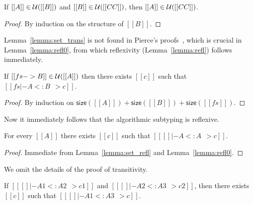 \begin{lemma} \label{lemma:set_trans}
  If $[[A]] \in \mathcal{U}([[B]])$ and $[[B]] \in \mathcal{U}([[CC]])$, then $[[A]] \in \mathcal{U}([[CC]])$.
\end{lemma}
\begin{proof}
  By induction on the structure of $[[B]]$.
\end{proof}

\begin{remark}
  Lemma~\ref{lemma:set_trans} is not found in Pierce's proofs~\cite{pierce1989decision}, which is
  crucial in Lemma~\ref{lemma:refl0}, from which reflexivity (Lemma~\ref{lemma:refl})
  follows immediately.
\end{remark}


\begin{lemma} \label{lemma:refl0}
  If $[[fs -> B]] \in \mathcal{U}([[A]])$ then there exists $[[c]]$ such that $[[fs |- A <: B ~~> c]]$.
\end{lemma}
\begin{proof}
  By induction on $\mathsf{size}([[A]]) + \mathsf{size}([[B]]) + \mathsf{size}([[fs]])$.
\end{proof}

Now it immediately follows that the algorithmic subtyping is reflexive.

\begin{lemma}[Reflexivity] \label{lemma:refl}
  For every $[[A]]$ there exists $[[c]]$ such that $[[ [] |- A <: A ~~> c]]$.
\end{lemma}
\begin{proof}
  Immediate from Lemma~\ref{lemma:set_refl} and Lemma~\ref{lemma:refl0}.
\end{proof}

We omit the details of the proof of transitivity.

\begin{lemma}[Transitivity] \label{lemma:trans}
  If $[[ [] |- A1 <: A2 ~~> c1]]$ and $[[ [] |- A2 <: A3 ~~> c2]]$, then there
  exists $[[c]]$ such that $[[ [] |- A1 <: A3 ~~> c]]$.
\end{lemma}

